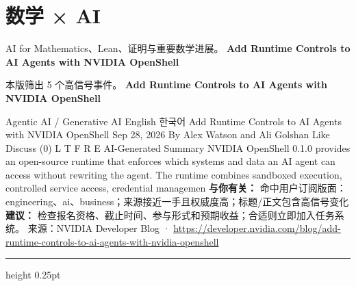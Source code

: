 \documentclass[10.5pt]{ctexart}
\begin{document}
\section*{数学 × AI}
{\color{ormuted} AI for Mathematics、Lean、证明与重要数学进展。}
\vspace{2mm}
{\LARGE\bfseries Add Runtime Controls to AI Agents with NVIDIA OpenShell}\par
\vspace{1mm}
{\color{ormuted} 本版筛出 5 个高信号事件。}
\vspace{3mm}
{\Large\bfseries Add Runtime Controls to AI Agents with NVIDIA OpenShell}\par
Agentic AI / Generative AI English 한국어 Add Runtime Controls to AI Agents with NVIDIA OpenShell Sep 28, 2026 By Alex Watson and Ali Golshan Like Discuss (0) L T F R E AI-Generated Summary NVIDIA OpenShell 0.1.0 provides an open-source runtime that enforces which systems and data an AI agent can access without rewriting the agent. The runtime combines sandboxed execution, controlled service access, credential managemen
\textbf{与你有关：} 命中用户订阅版面：engineering、ai、business；来源接近一手且权威度高；标题/正文包含高信号变化
\textbf{建议：} 检查报名资格、截止时间、参与形式和预期收益；合适则立即加入任务系统。
{\footnotesize\color{ormuted} 来源：NVIDIA Developer Blog · \url{https://developer.nvidia.com/blog/add-runtime-controls-to-ai-agents-with-nvidia-openshell}}
\vspace{4mm}
\hrule height 0.25pt
\vspace{3mm}
\end{document}
